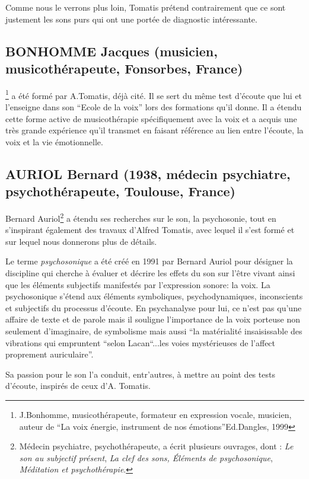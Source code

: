  Comme nous le verrons plus loin, Tomatis prétend contrairement que ce sont justement les sons purs
qui ont une portée de diagnostic intéressante.

  \subsection{ BONHOMME Jacques (musicien, musicothérapeute,
    Fonsorbes, France)} \footnote{J.Bonhomme, musicothérapeute, formateur 
  	en expression vocale, musicien, auteur de ``La voix énergie,
        instrument de nos émotions''Ed.Dangles, 1999}  a 
      été formé par A.Tomatis, déjà cité. Il se sert du même test d'écoute
      que lui et l'enseigne dans son ``Ecole de la voix'' lors des
      formations qu'il donne. Il a étendu cette  forme active de musicothérapie
      spécifiquement avec la voix 
     et a acquis une
      très grande expérience qu'il transmet en   
      faisant référence au lien entre l'écoute, la voix et la vie émotionnelle.

 \subsection{AURIOL Bernard (1938, médecin psychiatre,
   psychothérapeute, Toulouse, France)}

Bernard Auriol\footnote{Médecin psychiatre, psychothérapeute,  a écrit plusieurs ouvrages, dont : \textsl{Le son au subjectif présent}, \textsl{La clef des sons, Éléments de psychosonique}, \textsl{Méditation et
  psychothérapie}.}
a étendu ses recherches sur le son, la psychosonie, 
tout en s'inspirant également des
travaux d'Alfred Tomatis, avec lequel il s'est formé et sur lequel
nous donnerons plus de détails.

Le terme \emph{psychosonique} a été créé en 1991 par Bernard Auriol pour
désigner la discipline qui cherche à évaluer et décrire les effets du
son sur l'être vivant ainsi que les éléments
subjectifs manifestés par l'expression sonore:  la
voix. La psychosonique s'étend aux éléments
symboliques, psychodynamiques, inconscients et subjectifs du processus
d'écoute. En psychanalyse pour lui, ce n'est pas qu'une affaire de
texte et de parole mais il souligne l'importance de la voix porteuse non seulement
d'imaginaire, de symbolisme mais aussi ``la matérialité insaisissable
des vibrations qui empruntent ``selon Lacan``...les voies mystérieuses de
l'affect proprement auriculaire''. 
\autocite[chapter 13]{auriol:cle}

Sa passion pour le son l'a conduit, entr'autres, à mettre au point des tests
d'écoute, inspirés de ceux d'A. Tomatis.



